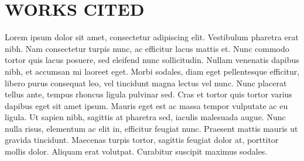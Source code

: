 \documentclass[a4paper]{memoir}
\begin{document}
\chapter{WORKS CITED}
\label{workscited}

Lorem ipsum dolor sit amet, consectetur adipiscing elit. Vestibulum pharetra erat nibh.
Nam consectetur turpis nunc, ac efficitur lacus mattis et. Nunc commodo tortor quis lacus posuere, sed eleifend nunc sollicitudin.
Nullam venenatis dapibus nibh, et accumsan mi laoreet eget.
Morbi sodales, diam eget pellentesque efficitur, libero purus consequat leo, vel tincidunt magna lectus vel nunc.
Nunc placerat tellus ante, tempus rhoncus ligula pulvinar sed.
Cras et tortor quis tortor varius dapibus eget sit amet ipsum.
Mauris eget est ac massa tempor vulputate ac eu ligula.
Ut sapien nibh, sagittis at pharetra sed, iaculis malesuada augue.
Nunc nulla risus, elementum ac elit in, efficitur feugiat nunc. Praesent mattis mauris ut gravida tincidunt.
Maecenas turpis tortor, sagittis feugiat dolor at, porttitor mollis dolor. Aliquam erat volutpat.
Curabitur suscipit maximus sodales.


\backmatter
\end{document}
